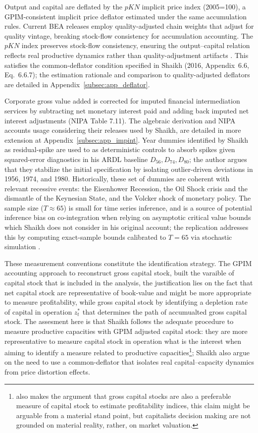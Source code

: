 \documentclass[11pt]{article}
\begin{document}
Output and capital are deflated by the $pKN$ implicit price index (2005=100), a GPIM-consistent implicit price deflator estimated under the same accumulation rules. Current BEA releases employ quality-adjusted chain weights that adjust for quality vintage, breaking stock-flow consistency for accumulation accounting. The $pKN$ index preserves stock-flow consistency, ensuring the output--capital relation reflects real productive dynamics rather than quality-adjustment artifacts \citep[Appendix~6.6, Sec.~II]{Shaikh2016}. This satisfies the common-deflator condition specified in Shaikh (2016, Appendix~6.6, Eq.~6.6.7); the estimation rationale and comparison to quality-adjusted deflators are detailed in Appendix~\ref{subsec:app_deflator}.

Corporate gross value added is corrected for imputed financial intermediation services by subtracting net monetary interest paid and adding back imputed net interest adjustments (NIPA Table 7.11). The algebraic derivation and NIPA accounts usage considering their releases used by Shaikh, are detailed in more extension at Appendix~\ref{subsec:app_impint}. Year dummies identified by Shaikh as residual-spike are used to as deterministic controls  to absorb spikes given squared-error diagnostics \citep{Patterson2000} in his ARDL baseline $D_{56}, D_{74}, D_{80}$; the author argues that they stabilize the initial specification by isolating outlier-driven deviations in 1956, 1974, and 1980. Historically, these set of dummies are coherent with relevant recessive events: the Eisenhower Recession, the Oil Shock crisis and the dismantle of the Keynesian State, and the Volcker shock of monetary policy. The sample size ($T \approx 65$) is small for time series inference, and is a source of potential inference bias on co-integration when relying on asymptotic critical value bounds which Shaikh does not consider in his original account; the replication addresses this by computing exact-sample bounds calibrated to $T=65$ via stochastic simulation \citep{NatsiopoulosTzeremes2022}.

These measurement conventions constitute the identification strategy. The GPIM accounting approach to reconstruct gross capital stock, built the varaible of capital stock that is included in the analysis, the justification lies on the fact that net capital stock are representative of book-value and might be more appropriate to measure profitability, while gross capital stock by identifying a depletion rate of capital in operation $z_t^*$ that determines the path of accumualted gross capital stock. The assesment here is that Shaikh follows the adequate procedure to measure productive capacities with GPIM adjusted capital stock: they are more representative to measure capital stock in operation what is the interest when aiming to identify a measure related to productive capacities\footnote{\citet{Shaikh2016} also makes the argument that gross capital stocks are also a preferable measure of capital stock to estimate profitability indices, this claim might be arguable from a material stand point, but capitalists decision making are not grounded on material reality, rather, on market valuation.}; Shaikh also argue on the need to use a common-deflator that isolates real capital--capacity dynamics from price distortion effects. 
\end{document}
